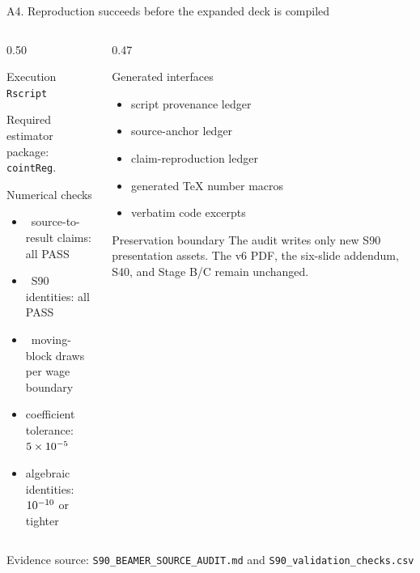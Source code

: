 \documentclass[10pt,aspectratio=169]{beamer}
\newcommand{\sourcefooter}[1]{%
  \par\vfill{\tiny\color{gray!70}Evidence source: #1}\vspace{-0.35em}}
\begin{document}
\begin{frame}{A4. Reproduction succeeds before the expanded deck is compiled}
  \begin{columns}[T,onlytextwidth]
    \begin{column}{0.50\textwidth}
      \begin{block}{Execution}
        \small
        \texttt{Rscript}\hspace{0.35em}

        \vspace{0.5em}
        Required estimator package: \texttt{cointReg}.
      \end{block}
      \begin{block}{Numerical checks}
        \small
        \begin{itemize}
          \item \ClaimCheckCount\ source-to-result claims: all PASS
          \item \ValidationCheckCount\ S90 identities: all PASS
          \item \BootstrapReplications\ moving-block draws per wage boundary
          \item coefficient tolerance: $5\times10^{-5}$
          \item algebraic identities: $10^{-10}$ or tighter
        \end{itemize}
      \end{block}
    \end{column}
    \begin{column}{0.47\textwidth}
      \begin{block}{Generated interfaces}
        \small
        \begin{itemize}
          \item script provenance ledger
          \item source-anchor ledger
          \item claim-reproduction ledger
          \item generated TeX number macros
          \item verbatim code excerpts
        \end{itemize}
      \end{block}
      \begin{alertblock}{Preservation boundary}
        The audit writes only new S90 presentation assets. The v6 PDF, the six-slide addendum, S40, and Stage B/C remain unchanged.
      \end{alertblock}
    \end{column}
  \end{columns}
  \sourcefooter{\texttt{S90\_BEAMER\_SOURCE\_AUDIT.md} and \texttt{S90\_validation\_checks.csv}}
\end{frame}
\end{document}
